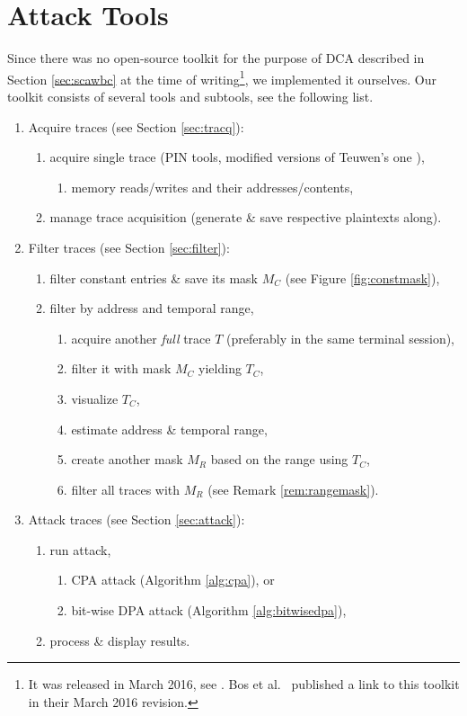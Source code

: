 \section{Attack Tools}
\label{sec:tools}

Since there was no open-source toolkit for the purpose of DCA described in Section \ref{sec:scawbc} at the time of writing\footnote{It was released in March 2016, see \cite{bos2016tools}. Bos et al.\ \cite{bos2015differential} published a link to this toolkit in their March 2016 revision.}, we implemented it ourselves. Our toolkit consists of several tools and subtools, see the following list.

\begin{enumerate}
	\item Acquire traces (see Section \ref{sec:tracq}):
	\begin{enumerate}
		\item acquire single trace (PIN tools, modified versions of Teuwen's one \cite{teuwen2015movfuscator}),
		\begin{enumerate}
			\item memory reads/writes and their addresses/contents,
		\end{enumerate}
		\item manage trace acquisition (generate \& save respective plaintexts along).
	\end{enumerate}
	\item Filter traces (see Section \ref{sec:filter}):
	\begin{enumerate}
		\item filter constant entries \& save its mask $M_C$ (see Figure \ref{fig:constmask}),
		\item filter by address and temporal range,
		\begin{enumerate}
			\item acquire another {\em full} trace $T$ (preferably in the same terminal session),
			\item filter it with mask $M_C$ yielding $T_C$,
			\item visualize $T_C$,
			\item estimate address \& temporal range,
			\item create another mask $M_R$ based on the range using $T_C$,
			\item filter all traces with $M_R$ (see Remark \ref{rem:rangemask}).
		\end{enumerate}
	\end{enumerate}
	\item Attack traces (see Section \ref{sec:attack}):
	\begin{enumerate}
		\item run attack,
		\begin{enumerate}
			\item CPA attack (Algorithm \ref{alg:cpa}), or
			\item bit-wise DPA attack (Algorithm \ref{alg:bitwisedpa}),
		\end{enumerate}
		\item process \& display results.
	\end{enumerate}
\end{enumerate}
